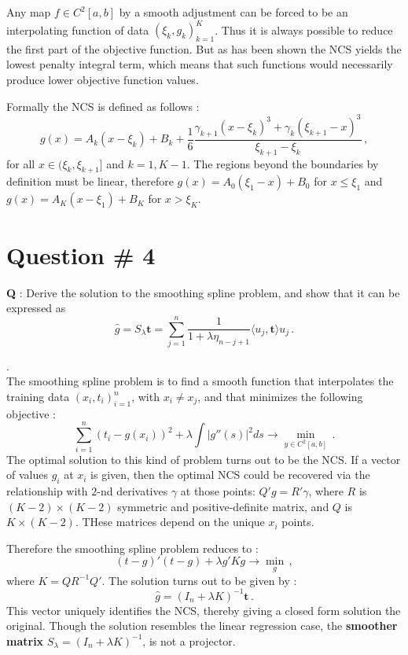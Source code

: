 \documentclass[a4paper]{article}
\begin{document}
Any map $f\in C^2[a,b]$ by a smooth adjustment can be forced to be an interpolating
function of data $(\xi_k, g_k)_{k=1}^K$. Thus it is always possible to reduce the
first part of the objective function. But as has been shown the NCS yields the lowest
penalty integral term, which means that such functions would necessarily produce
lower objective function values.

Formally the NCS is defined as follows :
\[
g(x)
= A_k(x - \xi_k) + B_k + \frac{1}{6}
	\frac{\gamma_{k+1}(x-\xi_k)^3+\gamma_k(\xi_{k+1}-x)^3}{\xi_{k+1}-\xi_k}\,,
\]
for all $x\in (\xi_k,\xi_{k+1}]$ and $k=1, K-1$. The regions beyond the boundaries
by definition must be linear, therefore $g(x) = A_0 (\xi_1-x) + B_0$ for $x\leq \xi_1$
and $g(x) = A_K (x-\xi_1) + B_K$ for $x > \xi_K$.


\clearpage

\section[Smoothing spline]{Question \# 4} %
\label{sec:question_4}
\textbf{\large \textbf{Q}} : Derive the solution to the smoothing spline problem,
and show that it can be expressed as
\[ \hat{g} = S_\lambda \mathbf{t} = \sum_{j=1}^n \frac{1}{1+\lambda \eta_{n-j+1}} \langle u_j, \mathbf{t} \rangle u_j \,. \]

 .\hfill\\
The smoothing spline problem is to find a smooth function that interpolates the
training data $(x_i,t_i)_{i=1}^n$, with $x_i\neq x_j$, and that minimizes the following
objective :
\[
\sum_{i=1}^n (t_i - g(x_i))^2 + \lambda \int |g''(s)|^2 ds \to \min_{y\in C^2[a,b]}\,.
\]
The optimal solution to this kind of problem turns out to be the NCS. If a vector
of values $g_i$ at $x_i$ is given, then the optimal NCS could be recovered via the
relationship with $2$-nd derivatives $\gamma$ at those points: $Q'g = R'\gamma$,
where $R$ is $(K-2)\times(K-2)$ symmetric and positive-definite matrix, and $Q$
is $K\times(K-2)$. THese matrices depend on the unique $x_i$ points.

Therefore the smoothing spline problem reduces to :
\[ (t - g)'(t - g) + \lambda g'K g \to \min_g \,,\]
where $K = Q R^{-1} Q'$. The solution turns out to be given by :
\[ \hat{g} = (I_n + \lambda K)^{-1} \mathbf{t} \,. \]
This vector uniquely identifies the NCS, thereby giving a closed form solution 
the original. Though the solution resembles the linear regression case, the \textbf{
smoother matrix} $S_\lambda = (I_n + \lambda K)^{-1}$, is not a projector.
\end{document}
